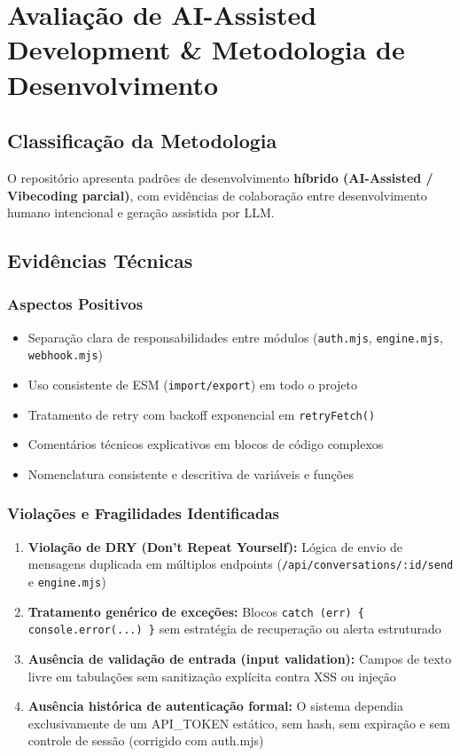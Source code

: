 \documentclass[11pt, a4paper]{article}
\begin{document}
\section{Avaliação de AI-Assisted Development \& Metodologia de Desenvolvimento}

\subsection{Classificação da Metodologia}

O repositório apresenta padrões de desenvolvimento \textbf{híbrido (AI-Assisted / Vibecoding parcial)}, com evidências de colaboração entre desenvolvimento humano intencional e geração assistida por LLM.

\subsection{Evidências Técnicas}

\subsubsection{Aspectos Positivos}
\begin{itemize}
  \item Separação clara de responsabilidades entre módulos (\texttt{auth.mjs}, \texttt{engine.mjs}, \texttt{webhook.mjs})
  \item Uso consistente de ESM (\texttt{import/export}) em todo o projeto
  \item Tratamento de retry com backoff exponencial em \texttt{retryFetch()}
  \item Comentários técnicos explicativos em blocos de código complexos
  \item Nomenclatura consistente e descritiva de variáveis e funções
\end{itemize}

\subsubsection{Violações e Fragilidades Identificadas}
\begin{enumerate}
  \item \textbf{Violação de DRY (Don't Repeat Yourself):} Lógica de envio de mensagens duplicada em múltiplos endpoints (\texttt{/api/conversations/:id/send} e \texttt{engine.mjs})
  \item \textbf{Tratamento genérico de exceções:} Blocos \texttt{catch (err) \{ console.error(...) \}} sem estratégia de recuperação ou alerta estruturado
  \item \textbf{Ausência de validação de entrada (input validation):} Campos de texto livre em tabulações sem sanitização explícita contra XSS ou injeção
  \item \textbf{Ausência histórica de autenticação formal:} O sistema dependia exclusivamente de um API\_TOKEN estático, sem hash, sem expiração e sem controle de sessão (corrigido com auth.mjs)
\end{enumerate}
\end{document}
